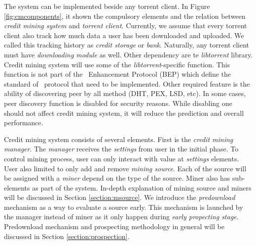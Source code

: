 The system can be implemented beside any torrent client. In Figure \ref{fig:cmcomponents}, it shown the compulsory elements and the relation between \textit{credit mining system} and \textit{torrent client}. Currently, we assume that every torrent client also track how much data a user has been downloaded and uploaded. We called this tracking history as \textit{credit storage} or \textit{bank}. Naturally, any torrent client must have \textit{downloading module} as well. Other dependency are te \textit{libtorrent} library. Credit mining system will use some of the \textit{libtorrent}-specific function. This function is not part of the \bt~Enhancement Protocol (BEP) which define the standard of \bt~protocol that need to be implemented. Other required feature is the ability of discovering peer by all method (DHT, PEX, LSD, etc). In some cases, peer discovery function is disabled for security reasons. While disabling one should not affect credit mining system, it will reduce the prediction and overall performance.

Credit mining system consists of several elements. First is the \textit{credit mining manager}. The \textit{manager} receives the \textit{settings} from user in the initial phase. To control mining process, user can only interact with value at \textit{settings} elements. User also limited to only add and remove \textit{mining source}. Each of the source will be assigned with a \textit{miner} depend on the type of the source. Miner also has sub-elements as part of the system. In-depth explanation of mining source and miners will be discussed in Section \ref{section:msource}. We introduce the \textit{predownload} mechanism as a way to evaluate a source early. This mechanism is launched by the manager instead of miner as it only happen during \textit{early propecting stage}. Predownload mechanism and prospecting methodology in general will be discussed in Section \ref{section:prospection}.

